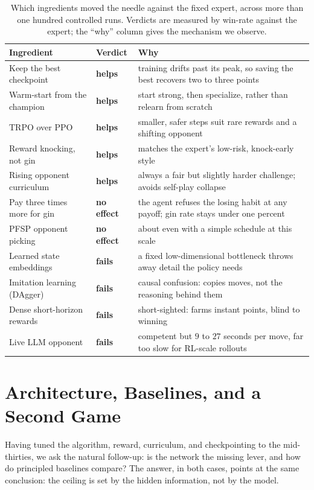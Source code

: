 \documentclass[letterpaper]{article} %
\newcommand{\helps}{\textbf{helps}}
\newcommand{\nofx}{\textbf{no effect}}
\newcommand{\fails}{\textbf{fails}}
\begin{document}
\begin{table}[t]
\centering
\small
\caption{Which ingredients moved the needle against the fixed expert, across
more than one hundred controlled runs. Verdicts are measured by win-rate against
the expert; the ``why'' column gives the mechanism we observe.}
\label{tab:verdicts}
\begin{tabular}{@{}lll@{}}
\toprule
\textbf{Ingredient} & \textbf{Verdict} & \textbf{Why} \\
\midrule
Keep the best checkpoint        & \helps & training drifts past its peak, so saving the best recovers two to three points \\
Warm-start from the champion    & \helps & start strong, then specialize, rather than relearn from scratch \\
TRPO over PPO                    & \helps & smaller, safer steps suit rare rewards and a shifting opponent \\
Reward knocking, not gin         & \helps & matches the expert's low-risk, knock-early style \\
Rising opponent curriculum      & \helps & always a fair but slightly harder challenge; avoids self-play collapse \\
Pay three times more for gin     & \nofx  & the agent refuses the losing habit at any payoff; gin rate stays under one percent \\
PFSP opponent picking           & \nofx  & about even with a simple schedule at this scale \\
Learned state embeddings        & \fails & a fixed low-dimensional bottleneck throws away detail the policy needs \\
Imitation learning (DAgger)     & \fails & causal confusion: copies moves, not the reasoning behind them \\
Dense short-horizon rewards     & \fails & short-sighted: farms instant points, blind to winning \\
Live LLM opponent               & \fails & competent but $9$ to $27$ seconds per move, far too slow for RL-scale rollouts \\
\bottomrule
\end{tabular}
\end{table}

\section{Architecture, Baselines, and a Second Game}
Having tuned the algorithm, reward, curriculum, and checkpointing to the
mid-thirties, we ask the natural follow-up: is the network the missing lever, and
how do principled baselines compare? The answer, in both cases, points at the
same conclusion: the ceiling is set by the hidden information, not by the model.
\end{document}
